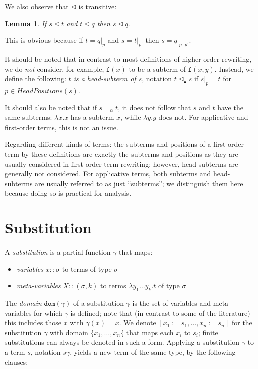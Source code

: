 \documentclass{lmcs}
\theoremstyle{theorem}\newtheorem{theorem}{Theorem}
\theoremstyle{theorem}\newtheorem{lemma}[theorem]{Lemma}
\theoremstyle{theorem}\newtheorem{corollary}[theorem]{Corollary}
\theoremstyle{definition}\newtheorem{definition}[theorem]{Definition}
\theoremstyle{definition}\newtheorem{example}[theorem]{Example}
\newcommand{\HeadPositions}{\mathit{HeadPositions}}
\newcommand{\domain}{\mathtt{dom}}
\newcommand{\atype}{\sigma}
\newcommand{\identifier}[1]{\mathtt{#1}}
\newcommand{\afun}{\identifier{f}}
\newcommand{\avar}{x}
\newcommand{\bvar}{y}
\newcommand{\Avar}{X}
\newcommand{\abs}[2]{\lambda #1.#2}
\newcommand{\subtermeq}{\unlhd}
\newcommand{\headsubtermeq}{\unlhd_{\bullet}}
\begin{document}
We also observe that $\subtermeq$ is transitive:

\begin{lemma}
If $s \subtermeq t$ and $t \subtermeq q$ then $s \subtermeq q$.
\end{lemma}

This is obvious because if $t = q|_p$ and $s = t|_{p'}$ then $s = q|_{p \cdot p'}$.

It should be noted that in contrast to most definitions of higher-order rewriting, we do \emph{not}
consider, for example, $\afun(x)$ to be a subterm of $\afun(x,y)$.  Instead, we define the
following: \emph{$t$ is a head-subterm of $s$}, notation $t \headsubtermeq s$ if $s|_p = t$ for
$p \in \HeadPositions(s)$.

It should also be noted that if $s =_\alpha t$, it does not follow that $s$ and $t$ have the same
subterms: $\abs{x}{x}$ has a subterm $x$, while $\abs{y}{y}$ does not.  For applicative and
first-order terms, this is not an issue.

Regarding different kinds of terms: the subterms and positions of a first-order term by these
definitions are exactly the subterms and positions as they are usually considered in first-order
term rewriting; however, head-subterms are generally not considered.  For applicative terms,
both subterms and head-subterms are usually referred to as just ``subterms''; we distinguish them
here because doing so is practical for analysis.

\section{Substitution}

A \emph{substitution} is a partial function $\gamma$ that maps:
\begin{itemize}
\item \emph{variables} $\avar :: \atype$ to terms of type $\atype$
\item \emph{meta-variables} $\Avar :: (\atype,k)$ to terms $\abs{\bvar_1 \dots
  \bvar_k}{t}$ of type $\atype$
\end{itemize}
The \emph{domain} $\domain(\gamma)$ of a substitution $\gamma$ is the set of
variables and meta-variables for which $\gamma$ is defined; note that (in
contrast to some of the literature) this includes those $\avar$ with
$\gamma(\avar) = \avar$.
We denote $[x_1:=s_1,\dots,x_n:=s_n]$ for the substitution $\gamma$ with
domain $\{x_1,\dots,x_n\{$ that maps each $x_i$ to $s_i$; finite substitutions
can always be denoted in such a form.
Applying a substitution $\gamma$ to a term $s$, notation $s\gamma$, yields a
new term of the same type, by the following clauses:
\end{document}
